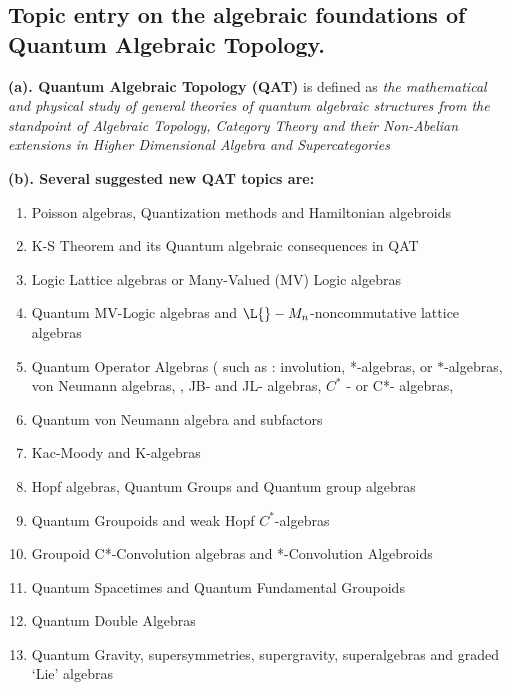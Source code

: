 \documentclass[12pt]{article}
\theoremstyle{plain}
\theoremstyle{definition}
\numberwithin{equation}{section}
\newcommand{\<}{{\langle}}
\begin{document}
\subsection{Topic entry on the algebraic foundations of Quantum Algebraic Topology.}

\textbf{(a). Quantum Algebraic Topology (QAT)} is defined as \emph{the mathematical and physical study of  general theories of quantum algebraic structures from the standpoint of Algebraic Topology, Category Theory and their Non-Abelian extensions in Higher Dimensional Algebra and Supercategories}

\textbf{(b). Several suggested new QAT topics are:}

\begin{enumerate}

\item Poisson algebras, Quantization methods and Hamiltonian algebroids

\item K-S Theorem and its Quantum algebraic consequences in QAT

\item Logic Lattice algebras or Many-Valued (MV)  Logic algebras 

\item Quantum MV-Logic algebras and $\L{}-M_n$-noncommutative lattice algebras

\item Quantum Operator Algebras ( such as :   involution, *-algebras, or $*$-algebras, von Neumann algebras,
, JB- and JL- algebras,   $C^*$ - or C*- algebras, 

\item Quantum von Neumann algebra and subfactors

\item Kac-Moody and K-algebras

\item Hopf algebras, Quantum Groups and Quantum group algebras

\item Quantum Groupoids and weak Hopf $C^*$-algebras

\item Groupoid C*-Convolution algebras and *-Convolution Algebroids

\item Quantum Spacetimes and Quantum Fundamental Groupoids 

\item Quantum Double Algebras

\item Quantum Gravity, supersymmetries, supergravity, superalgebras and graded `Lie' algebras


\end{enumerate}
\end{document}
